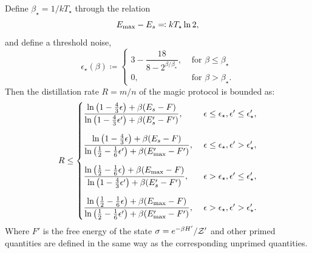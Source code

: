 \documentclass[pra,
aps,
twocolumn,
superscriptaddress,
groupedaddress,
nofootinbib,
reprint
]{revtex4-1}
\begin{document}
\begin{theorem}
Define $\beta_\star = 1/kT_\star$ through the relation
\begin{equation}
	E_{\rm max} - E_s \eqqcolon kT_\star \ln 2,
\end{equation}
and define a threshold noise,
\begin{equation}
	\epsilon_{\star}(\beta) \coloneqq 
	\begin{cases}
		3 - \dfrac{18}{8-2^{\beta/\beta_\star}}, &\text{ for } \beta \leq \beta_\star \\
		0, &\text{ for } \beta > \beta_\star.
	\end{cases}
\end{equation}
Then the distillation rate $R = m/n$ of the magic protocol is bounded as:
\begin{equation}\label{eq:rate_bounds_proof}
	R \leq
	\begin{cases}
		\dfrac{\ln{\big( 1-\frac{4}{3}\epsilon \big)} + \beta (E_s - F)}{\ln{\big( 1-\frac{4}{3}\epsilon' \big)} + \beta (E'_s - F')},\ &\epsilon \leq \epsilon_\star, \epsilon' \leq \epsilon'_\star, \vspace{10pt}\\
		\dfrac{\ln{\big( 1-\frac{4}{3}\epsilon \big)} + \beta (E_s - F)}{\ln{\big( \frac{1}{2}-\frac{1}{6}\epsilon' \big)} + \beta (E'_{\rm{max}} - F')},\ &\epsilon \leq \epsilon_\star, \epsilon' > \epsilon'_\star, \vspace{10pt}\\
		\dfrac{\ln{\big( \frac{1}{2}-\frac{1}{6}\epsilon \big)} + \beta (E_{\rm{max}} - F)}{\ln{\big( 1-\frac{4}{3}\epsilon' \big)} + \beta (E'_s - F')},\ &\epsilon > \epsilon_\star, \epsilon' \leq \epsilon'_\star, \vspace{10pt}\\
		\dfrac{\ln{\big( \frac{1}{2}-\frac{1}{6}\epsilon \big)} + \beta (E_{\rm{max}} - F)}{\ln{\big( \frac{1}{2}-\frac{1}{6}\epsilon' \big)} + \beta (E'_{\rm{max}} - F')},\ &\epsilon > \epsilon_\star, \epsilon' > \epsilon'_\star.
	\end{cases}
\end{equation}
Where $F'$ is the free energy of the state $\sigma = e^{-\beta H'}/\mathcal{Z}'$ and other primed quantities are defined in the same way as the corresponding unprimed quantities. 
\end{theorem}
\end{document}
